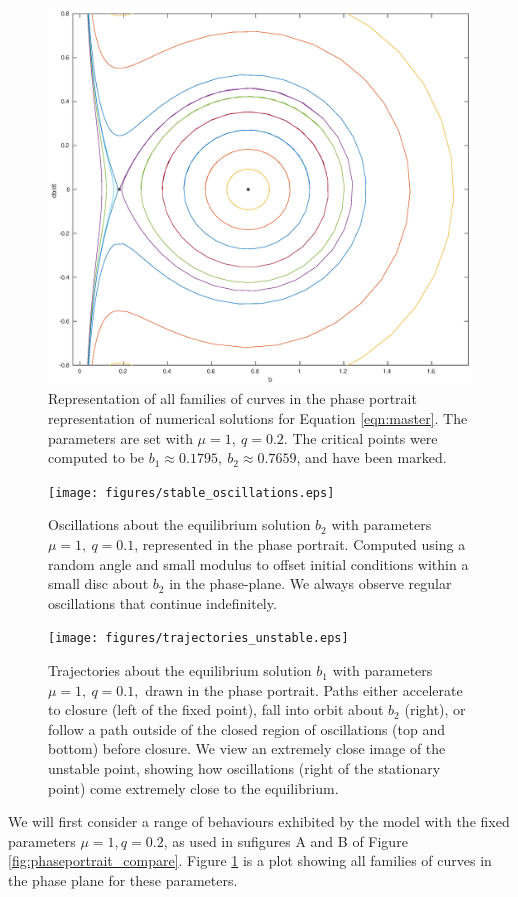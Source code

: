 \documentclass{report}
\begin{document}
\begin{figure}
    \centering
    \includegraphics[width=\linewidth]{phaseportrait}
    \caption{
        Representation of all families of curves in the phase portrait representation of numerical solutions for Equation \ref{eqn:master}.
        The parameters are set with $\mu = 1,~q=0.2$. The critical points were computed to be $b_1 \approx 0.1795,~ b_2 \approx 0.7659$, and have been marked.
    }
    \label{fig:phaseportrait_oscillations}
\end{figure}

\begin{figure}
    \centering
    \texttt{[image: figures/stable\_oscillations.eps]}
    \caption{
        Oscillations about the equilibrium solution $b_2$ with parameters $\mu=1,~q=0.1$, represented in the phase portrait.
        Computed using a random angle and small modulus to offset initial conditions within a small disc about $b_2$ in the phase-plane.
        We always observe regular oscillations that continue indefinitely.
    }
    \label{fig:stable_oscillations}
\end{figure}

\begin{figure}
    \centering
    \texttt{[image: figures/trajectories\_unstable.eps]}
    \caption{
        Trajectories about the equilibrium solution $b_1$ with parameters $\mu=1,~q=0.1,$ drawn in the phase portrait.
        Paths either accelerate to closure (left of the fixed point), fall into orbit about $b_2$ (right),
        or follow a path outside of the closed region of oscillations (top and bottom) before closure.
        We view an extremely close image of the unstable point,
        showing how oscillations (right of the stationary point) come extremely close to the equilibrium.
    }
    \label{fig:unstable_trajectories}
\end{figure}
We will first consider a range of behaviours exhibited by the model with the fixed parameters $\mu=1, q=0.2$,
as used in sufigures A and B of Figure \ref{fig:phaseportrait_compare}.
Figure \ref{fig:phaseportrait_oscillations} is a plot showing all families of curves in the phase plane for these parameters.
\end{document}
